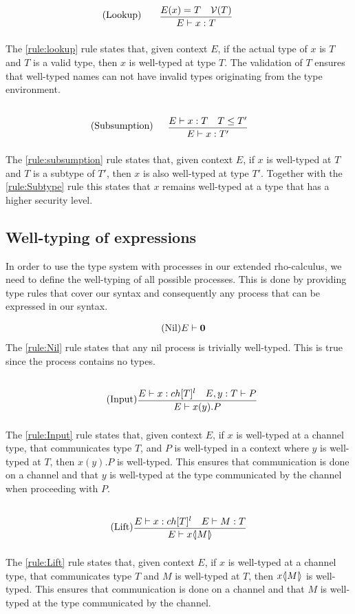 \begin{align*}
\tag{Lookup}\label{rule:lookup} &\infrule{E(x)=T\quad\valid{T}}{E\vdash x:T}
\end{align*}
The \ref{rule:lookup} rule states that, given context $E$, if the actual type of $x$ is $T$ and $T$ is a valid type, then $x$ is well-typed at type $T$.
The validation of $T$ ensures that well-typed names can not have invalid types originating from the type environment.

\begin{align*}
\tag{Subsumption}\label{rule:subsumption} &\infrule{E\vdash x:T\quad T\leq T'}{E\vdash x:T'}
\end{align*}
The \ref{rule:subsumption} rule states that, given context $E$, if $x$ is well-typed at $T$ and $T$ is a subtype of $T'$, then $x$ is also well-typed at type $T'$.
Together with the \ref{rule:Subtype} rule this states that $x$ remains well-typed at a type that has a higher security level.

\subsection{Well-typing of expressions}
In order to use the type system with processes in our extended rho-calculus, we need to define the well-typing of all possible processes.
This is done by providing type rules that cover our syntax and consequently any process that can be expressed in our syntax.

\begin{align*}
\tag{Nil}\label{rule:Nil} &E \vdash \mathbf{0}
\end{align*}
The \ref{rule:Nil} rule states that any nil process is trivially well-typed.
This is true since the process contains no types.

\begin{align*}
\tag{Input}\label{rule:Input} &\infrule{E\vdash x:ch[T]^l\quad E,y:T\vdash P}{E \vdash \inp{x}{y}P}
\end{align*}
The \ref{rule:Input} rule states that, given context $E$, if $x$ is well-typed at a channel type, that communicates type $T$, and $P$ is well-typed in a context where $y$ is well-typed at $T$, then $x(y).P$ is well-typed.
This ensures that communication is done on a channel and that $y$ is well-typed at the type communicated by the channel when proceeding with $P$.

\begin{align*}
\tag{Lift}\label{rule:Lift} &\infrule{E\vdash x:ch[T]^l\quad E \vdash M:T}{E\vdash \lift{x}{M}}
\end{align*}
The \ref{rule:Lift} rule states that, given context $E$, if $x$ is well-typed at a channel type, that communicates type $T$ and $M$ is well-typed at $T$, then $x \langle \! | M | \! \rangle$ is well-typed.
This ensures that communication is done on a channel and that $M$ is well-typed at the type communicated by the channel.

